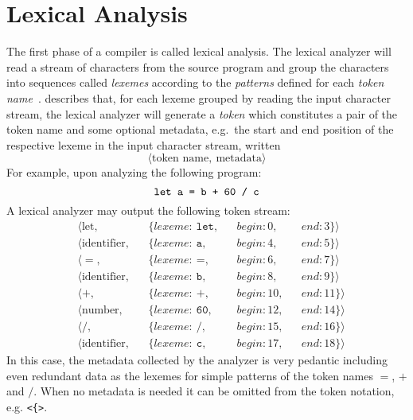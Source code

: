 \documentclass[
  oneside,
  english,
  coorientadorbanca,
  embeddedlogo,
  noabntexcite
]{ufsc-thesis-rn46-2019}
\begin{document}
\section{Lexical Analysis}\label{chapter:background:sec:lexical}

The first phase of a compiler is called lexical analysis.
The lexical analyzer will read a stream of characters from the source program and group the characters into sequences called \textit{lexemes} according to the \textit{patterns} defined for each \textit{token name}~\cite{Aho:2006:CPT:1177220}.
\textcite{Aho:2006:CPT:1177220} describes that, for each lexeme grouped by reading the input character stream, the lexical analyzer will generate a \textit{token} which constitutes a pair of the token name and some optional metadata, e.g.\ the start and end position of the respective lexeme in the input character stream, written
\begin{equation*}
  \langle \textrm{token name},\ \textrm{metadata}\rangle
\end{equation*}
For example, upon analyzing the following program:
\begin{equation*}
  \verb|let a = b + 60 / c|
\end{equation*}
A lexical analyzer may output the following token stream:
\begin{equation}\label{figure:introduction_token_stream}
  \begin{aligned}
     & \langle \textrm{let},        &  & \{lexeme:\ \texttt{let}, &  & begin: 0,  &  & end: 3\}\rangle  \\
     & \langle \textrm{identifier}, &  & \{lexeme:\ \texttt{a},   &  & begin: 4,  &  & end: 5\}\rangle  \\
     & \langle =,                   &  & \{lexeme:\ \texttt{=},   &  & begin: 6,  &  & end: 7\}\rangle  \\
     & \langle \textrm{identifier}, &  & \{lexeme:\ \texttt{b},   &  & begin: 8,  &  & end: 9\}\rangle  \\
     & \langle +,                   &  & \{lexeme:\ +,            &  & begin: 10, &  & end: 11\}\rangle \\
     & \langle \textrm{number},     &  & \{lexeme:\ \texttt{60},  &  & begin: 12, &  & end: 14\}\rangle \\
     & \langle /,                   &  & \{lexeme:\ /,            &  & begin: 15, &  & end: 16\}\rangle \\
     & \langle \textrm{identifier}, &  & \{lexeme:\ \texttt{c},   &  & begin: 17, &  & end: 18\}\rangle
  \end{aligned}
\end{equation}
In this case, the metadata collected by the analyzer is very pedantic including even redundant data as the lexemes for simple patterns of the token names $=$, $+$ and $/$.
When no metadata is needed it can be omitted from the token notation, e.g. \verb+<{>+.
\end{document}
